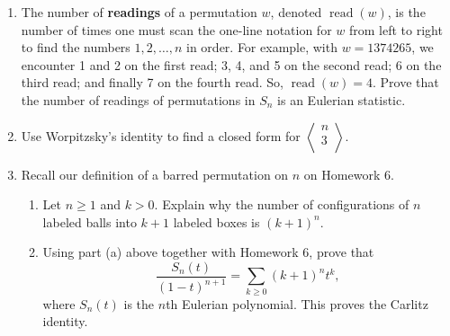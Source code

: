 \documentclass[11pt]{article}%
\theoremstyle{definition}
\DeclareMathOperator{\reading}{read}
\newcommand{\euler}[2]{
  \displaystyle \left\langle\begin{matrix}#1  \\#2  \\ \end{matrix}\right\rangle}
\begin{document}
\begin{enumerate}

\item The number of \textbf{readings} of a permutation $w$, denoted $\reading(w)$, is the number of times one must scan the one-line notation for $w$ from left to right to find the numbers $1,2,\ldots, n$ in order.  For example, with $w=1374265$, we encounter 1 and 2 on the first read; 3, 4, and 5 on the second read; 6 on the third read; and finally 7 on the fourth read.  So, $\reading(w)=4$.  Prove that the number of readings of permutations in $S_n$ is an Eulerian statistic.

\item Use Worpitzsky's identity to find a closed form for $\euler{n}{3}$.

\item Recall our definition of a barred permutation on $n$ on Homework 6.
\begin{enumerate}
\item Let $n\geq 1$ and $k>0$. Explain why the number of configurations of $n$ labeled balls into $k+1$ labeled boxes is $(k+1)^n$.

\item Using part (a) above together with Homework 6, prove that
\[
\frac{S_n(t)}{(1-t)^{n+1}}=\sum_{k\geq 0}(k+1)^nt^k,
\]
where $S_n(t)$ is the $n$th Eulerian polynomial. This proves the Carlitz identity.
\end{enumerate}


\end{enumerate}
\end{document}

